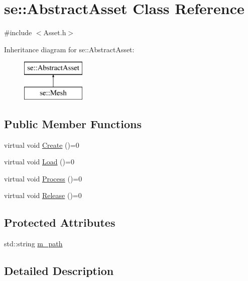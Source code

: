 \hypertarget{classse_1_1_abstract_asset}{}\section{se\+:\+:Abstract\+Asset Class Reference}
\label{classse_1_1_abstract_asset}


{\ttfamily \#include $<$Asset.\+h$>$}

Inheritance diagram for se\+:\+:Abstract\+Asset\+:\begin{figure}[H]
\begin{center}
\leavevmode
\includegraphics[height=2.000000cm]{classse_1_1_abstract_asset}
\end{center}
\end{figure}
\subsection*{Public Member Functions}
\begin{DoxyCompactItemize}
\item 
virtual void \mbox{\hyperlink{classse_1_1_abstract_asset_ae3f9fb8f5c26ac8ea511e8e21f5bd624}{Create}} ()=0
\item 
virtual void \mbox{\hyperlink{classse_1_1_abstract_asset_afb4dff418acf169d81b6ca5d8c1f6548}{Load}} ()=0
\item 
virtual void \mbox{\hyperlink{classse_1_1_abstract_asset_a1f2fdf75bbeaddec16dc4778063505b7}{Process}} ()=0
\item 
virtual void \mbox{\hyperlink{classse_1_1_abstract_asset_aea97e36f647efdb07a801b6fc468388d}{Release}} ()=0
\end{DoxyCompactItemize}
\subsection*{Protected Attributes}
\begin{DoxyCompactItemize}
\item 
std\+::string \mbox{\hyperlink{classse_1_1_abstract_asset_afa609af58ca8617ef9ab7f6de84e121f}{m\+\_\+path}}
\end{DoxyCompactItemize}


\subsection{Detailed Description}


